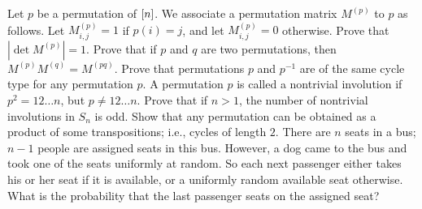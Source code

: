 \begin{chapterendexercises}
  \exercise Let $p$ be a permutation of ${[{n}]}$. We associate a permutation matrix
    $M^{(p)}$ to $p$ as follows. Let $M^{(p)}_{i, j} = 1$ if $p(i) = j$, and let
    $M^{(p)}_{i, j} = 0$ otherwise. Prove that $|\det M^{(p)}| = 1$.
  \exercise Prove that if $p$ and $q$ are two permutations, then
    $M^{(p)} M^{(q)} = M^{(pq)}$.
  \exercise[recommended] Prove that permutations $p$ and $p^{-1}$ are of the
    same cycle type for any permutation $p$.
  \exercise A permutation $p$ is called a nontrivial involution if
    $p^2 = 1 2 \dots n$, but $p \neq 1 2 \dots n$. Prove that if $n > 1$, the
    number of nontrivial involutions in $S_n$ is odd.
  \exercise Show that any permutation can be obtained as a product of some
    transpositions; i.e., cycles of length $2$.
  \exercise There are $n$ seats in a bus; $n - 1$ people are assigned seats in
    this bus. However, a dog came to the bus and took one of the seats uniformly
    at random. So each next passenger either takes his or her seat if it is
    available, or a uniformly random available seat otherwise. What is the
    probability that the last passenger seats on the assigned seat?
\end{chapterendexercises}
